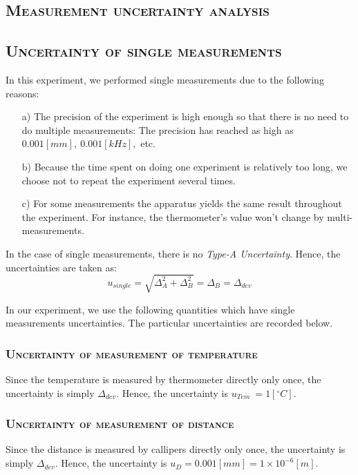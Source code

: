\documentclass[a4paper,12pt]{article}
\begin{document}
\begin{appendices} 
      \section{\textsc{Measurement uncertainty analysis}} 
      \subsection{\textsc{Uncertainty of single measurements}}
      In this experiment, we performed single measurements due to the following reasons:
      \begin{itemize}
      \item[a)] 
      The precision of the experiment is high enough so that there is no need to do multiple measurements: The precision has reached as high as $0.001 [mm],~0.001 [kHz],$ etc.
      \item[b)]
      Because the time spent on doing one experiment is relatively too long, we choose not to repeat the experiment several times.
      \item[c)]
      For some measurements the apparatus yields the same result throughout the experiment. For instance, the thermometer's value won't change by multi-measurements. 
      \end{itemize}
      \par
      In the case of single measurements, there is no \textit{Type-A Uncertainty}. Hence, the uncertainties are taken as:
      		\begin{equation}
      		u_{single} = \sqrt{\Delta_A^2 + \Delta_B^2} = \Delta_B = \Delta_{dev}
      		\end{equation}
      		\par
      In our experiment, we use the following quantities which have single measurements uncertainties. The particular uncertainties are recorded below.
      \subsubsection{\textsc{Uncertainty of measurement of temperature}}
      Since the temperature is measured by thermometer directly only once, the uncertainty is simply $\Delta_{dev}$. Hence, the uncertainty is $u_{Tem}~ = 1[^{\circ}C]$.
       \subsubsection{\textsc{Uncertainty of measurement of distance}}
      Since the distance is measured by callipers directly only once, the uncertainty is simply $\Delta_{dev}$. Hence, the uncertainty is $u_D = 0.001 [mm] = 1 \times 10^{-6} [m]$.

\end{appendices}
\end{document}
